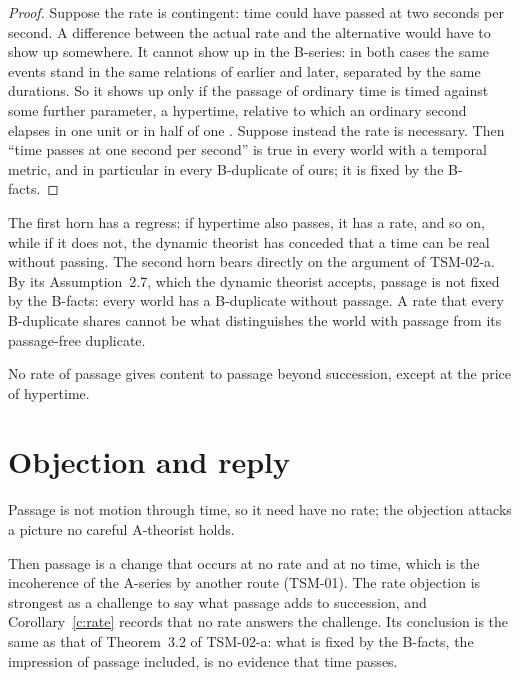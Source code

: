 \documentclass{situationist-preprint}
\begin{document}
\begin{proof}
Suppose the rate is contingent: time could have passed at two seconds per second. A difference between the actual rate and the alternative would have to show up somewhere. It cannot show up in the B-series: in both cases the same events stand in the same relations of earlier and later, separated by the same durations. So it shows up only if the passage of ordinary time is timed against some further parameter, a hypertime, relative to which an ordinary second elapses in one unit or in half of one \citep{Smart1949}. Suppose instead the rate is necessary. Then \enquote{time passes at one second per second} is true in every world with a temporal metric, and in particular in every B-duplicate of ours; it is fixed by the B-facts.
\end{proof}

The first horn has a regress: if hypertime also passes, it has a rate, and so on, while if it does not, the dynamic theorist has conceded that a time can be real without passing. The second horn bears directly on the argument of TSM-02-a. By its Assumption~2.7, which the dynamic theorist accepts, passage is not fixed by the B-facts: every world has a B-duplicate without passage. A rate that every B-duplicate shares cannot be what distinguishes the world with passage from its passage-free duplicate.

\begin{corollary}\label{c:rate}
No rate of passage gives content to passage beyond succession, except at the price of hypertime.
\end{corollary}

\section{Objection and reply}

\begin{objection}
Passage is not motion through time, so it need have no rate; the objection attacks a picture no careful A-theorist holds.
\end{objection}

\begin{reply}
Then passage is a change that occurs at no rate and at no time, which is the incoherence of the A-series by another route (TSM-01). The rate objection is strongest as a challenge to say what passage adds to succession, and Corollary~\ref{c:rate} records that no rate answers the challenge. Its conclusion is the same as that of Theorem~3.2 of TSM-02-a: what is fixed by the B-facts, the impression of passage included, is no evidence that time passes.
\end{reply}
\end{document}
